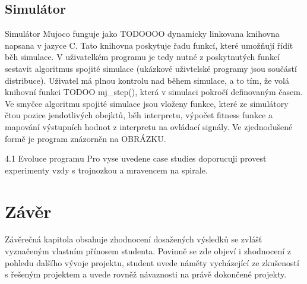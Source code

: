 \section{Simulátor}
Simulátor Mujoco funguje jako TODOOOO dynamicky linkovana knihovna napsana v jazyce C.
Tato knihovna poskytuje řadu funkcí, které umožňují řídít běh simulace.
V uživatelkém programu je tedy nutné z poskytnutých funkcí sestavit algoritmus spojité simulace (ukázkové uživtelské programy jsou součástí distribuce).
Uživatel má plnou kontrolu nad během simulace, a to tím, že volá knihovní funkci TODOO mj\_step(), která v simulaci pokročí definovaným časem.
Ve smyčce algoritmu spojité simulace jsou vloženy funkce, které ze simulátory čtou pozice jendotlivých obejktů, běh interpretu, výpočet fitness funkce a mapování výstupních hodnot z interpretu na ovládací signály.
Ve zjednodušené formě je program znázorněn na OBRÁZKU.






4.1 Evoluce programu
Pro vyse uvedene case studies doporucuji provest experimenty vzdy s
trojnozkou a mravencem na spirale.


\chapter{Závěr}
Závěrečná kapitola obsahuje zhodnocení dosažených výsledků se zvlášť vyznačeným vlastním přínosem studenta. Povinně se zde objeví i zhodnocení z pohledu dalšího vývoje projektu, student uvede náměty vycházející ze zkušeností s řešeným projektem a uvede rovněž návaznosti na právě dokončené projekty.


